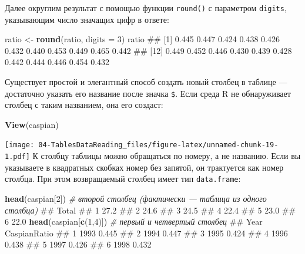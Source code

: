 \documentclass[]{book}
\newenvironment{Shaded}{\begin{snugshade}}{\end{snugshade}}
\newcommand{\KeywordTok}[1]{\textcolor[rgb]{0.13,0.29,0.53}{\textbf{#1}}}
\newcommand{\DataTypeTok}[1]{\textcolor[rgb]{0.13,0.29,0.53}{#1}}
\newcommand{\DecValTok}[1]{\textcolor[rgb]{0.00,0.00,0.81}{#1}}
\newcommand{\StringTok}[1]{\textcolor[rgb]{0.31,0.60,0.02}{#1}}
\newcommand{\CommentTok}[1]{\textcolor[rgb]{0.56,0.35,0.01}{\textit{#1}}}
\newcommand{\OperatorTok}[1]{\textcolor[rgb]{0.81,0.36,0.00}{\textbf{#1}}}
\newcommand{\NormalTok}[1]{#1}
\begin{document}
Далее округлим результат с помощью функции \texttt{round()} с параметром
\texttt{digits}, указывающим число значащих цифр в ответе:

\begin{Shaded}
\begin{Highlighting}[]
\NormalTok{ratio <-}\StringTok{ }\KeywordTok{round}\NormalTok{(ratio, }\DataTypeTok{digits =} \DecValTok{3}\NormalTok{)}
\NormalTok{ratio}
\NormalTok{##  [1] 0.445 0.447 0.424 0.438 0.426 0.432 0.440 0.453 0.449 0.465 0.442}
\NormalTok{## [12] 0.449 0.452 0.446 0.430 0.439 0.428 0.442 0.444 0.446 0.454 0.432}
\end{Highlighting}
\end{Shaded}

Существует простой и элегантный способ создать новый столбец в таблице
--- достаточно указать его название после значка \texttt{\$}. Если среда
R не обнаруживает столбец с таким названием, она его создаст:

\begin{Shaded}
\end{Shaded}

\begin{Shaded}
\begin{Highlighting}[]
\KeywordTok{View}\NormalTok{(caspian)}
\end{Highlighting}
\end{Shaded}

\texttt{[image: 04-TablesDataReading\_files/figure-latex/unnamed-chunk-19-1.pdf]}
К столбцу таблицы можно обращаться по номеру, а не названию. Если вы
указываете в квадратных скобках номер без запятой, он трактуется как
номер столбца. При этом возвращаемый столбец имеет тип
\texttt{data.frame}:

\begin{Shaded}
\begin{Highlighting}[]
\KeywordTok{head}\NormalTok{(caspian[}\DecValTok{2}\NormalTok{])  }\CommentTok{# второй столбец (фактически — таблица из одного столбца)}
\NormalTok{##   Total}
\NormalTok{## 1  27.2}
\NormalTok{## 2  24.6}
\NormalTok{## 3  24.5}
\NormalTok{## 4  22.4}
\NormalTok{## 5  23.0}
\NormalTok{## 6  22.0}
\KeywordTok{head}\NormalTok{(caspian[}\KeywordTok{c}\NormalTok{(}\DecValTok{1}\NormalTok{,}\DecValTok{4}\NormalTok{)])  }\CommentTok{# первый и четвертый столбец}
\NormalTok{##   Year CaspianRatio}
\NormalTok{## 1 1993        0.445}
\NormalTok{## 2 1994        0.447}
\NormalTok{## 3 1995        0.424}
\NormalTok{## 4 1996        0.438}
\NormalTok{## 5 1997        0.426}
\NormalTok{## 6 1998        0.432}
\end{Highlighting}
\end{Shaded}
\end{document}
